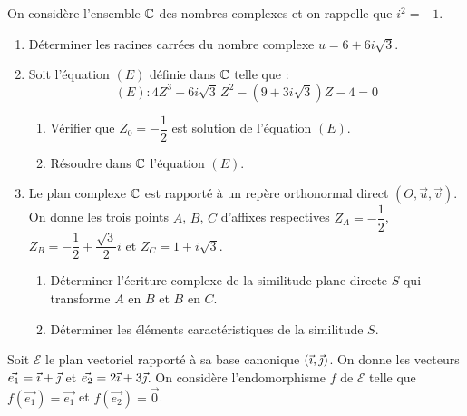 \documentclass[11pt]{article}
\begin{document}


On considère l'ensemble $\mathbb{C}$ des nombres complexes et on rappelle que $i^2 = -1$.

\begin{enumerate}
  \item Déterminer les racines carrées du nombre complexe $u = 6 + 6i\sqrt{3}$.
  \item Soit l'équation $(E)$ définie dans $\mathbb{C}$ telle que :
  \[ (E) : 4Z^3 - 6i\sqrt{3}\,Z^2 - (9 + 3i\sqrt{3})Z - 4 = 0 \]
  \begin{enumerate}[label=\alph*.]
    \item Vérifier que $Z_0 = -\dfrac{1}{2}$ est solution de l'équation $(E)$.
    \item Résoudre dans $\mathbb{C}$ l'équation $(E)$.
  \end{enumerate}
  \item Le plan complexe $\mathbb{C}$ est rapporté à un repère orthonormal direct $(O,\vec{u},\vec{v})$. On donne les trois points $A$, $B$, $C$ d'affixes respectives $Z_A = -\dfrac{1}{2}$, $Z_B = -\dfrac{1}{2} + \dfrac{\sqrt{3}}{2}i$ et $Z_C = 1 + i\sqrt{3}$.
  \begin{enumerate}[label=\alph*.]
    \item Déterminer l'écriture complexe de la similitude plane directe $S$ qui transforme $A$ en $B$ et $B$ en $C$.
    \item Déterminer les éléments caractéristiques de la similitude $S$.
  \end{enumerate}
\end{enumerate}


Soit $\mathcal{E}$ le plan vectoriel rapporté à sa base canonique $(\vec{\imath},\vec{\jmath})$. On donne les vecteurs $\vec{e_1} = \vec{\imath} + \vec{\jmath}$ et $\vec{e_2} = 2\vec{\imath} + 3\vec{\jmath}$. On considère l'endomorphisme $f$ de $\mathcal{E}$ telle que $f(\vec{e_1}) = \vec{e_1}$ et $f(\vec{e_2}) = \vec{0}$.
\end{document}
